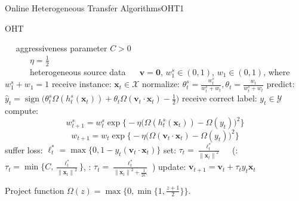 \documentclass{beamer}
\DeclareMathOperator{\sign}{sign}
\begin{document}
\begin{frame}{Online Heterogeneous Transfer Algorithms}{OHT1}
\begin{algorithm}[H]
\begin{algorithmic}[1]
\caption{OHT}
\tiny
\REQUIRE ~~
aggressiveness parameter $C>0$\\ 
~~~~~~$\eta = \frac{1}{2}$ \\
~~~~~~heterogeneous source data
\ENSURE ~~
$\mathbf{v} = \mathbf{0}$, $w_{1}^{s} \in (0,1)$, $w_{1} \in (0,1)$, where $w_{1}^{s} + w_1 = 1$
\STATE 
  receive instance: $\mathbf{x}_t \in \mathcal{X}$
\STATE
  normalize: $\theta_{t}^{s} = \frac{w_{t}^{s}}{w_{t}^{s}+w_t}, \theta_{t} = \frac{w_{t}}{w_{t}^{s}+w_t}$
\STATE
  predict: $\hat{y}_t = \sign \big( \theta_{t}^{s} \varOmega (h_{t}^{s}(\mathbf{x}_t)) + \theta_{t} \varOmega (\mathbf{v}_t \cdot \mathbf{x}_t) - \frac{1}{2} \big)$
\STATE
  receive correct label: $y_t \in \mathcal{Y}$
\STATE
  compute: 
    $$w_{t+1}^{s} = w_{t}^{s} \exp \big\{ -\eta \big(\varOmega(h_{t}^{s}(\mathbf{x}_t)) - \varOmega(y_t)\big)^2 \big\} $$
    $$w_{t+1} = w_{t} \exp \big\{ -\eta \big(\varOmega(\mathbf{v}_t \cdot \mathbf{x}_t) - \varOmega(y_t)\big)^2 \big\} $$
\STATE
  suffer loss: $\ell_{t}^{*} = \max \{0, 1-y_t(\mathbf{v}_t \cdot \mathbf{x}_t)\}$
\STATE
  set: $\tau_t = \frac{\ell_{t}^{*}}{{\|\mathbf{x}_t\|}^2}$
	~~(\uppercase\expandafter{}: $\tau_t = \min \{ C, \frac{\ell_{t}^{*}}{{\|\mathbf{x}_t\|}^2} \} $, 
	\uppercase\expandafter{}: $ \tau_t = \frac{\ell_{t}^{*}}{{\|\mathbf{x}_t\|}^2 + \frac{1}{2C}} $ )
\STATE
  update: $ \mathbf{v}_{t+1} = \mathbf{v}_t + \tau_t y_t \mathbf{x}_t $
\ENDFOR
\end{algorithmic}
\end{algorithm}
\begin{footnotesize}
Project function $\varOmega(z) = \max \{ 0, \min \{ 1, \frac{z+1}{2} \}\}$.
\end{footnotesize}
\end{frame}
\end{document}
